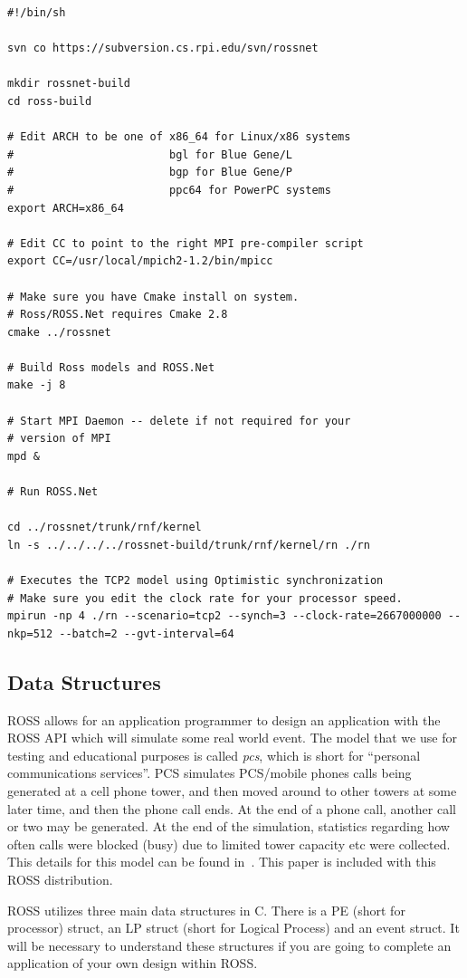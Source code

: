 \documentclass[12pt]{article}
\begin{document}
\begin{verbatim}
#!/bin/sh

svn co https://subversion.cs.rpi.edu/svn/rossnet

mkdir rossnet-build
cd ross-build

# Edit ARCH to be one of x86_64 for Linux/x86 systems 
#                        bgl for Blue Gene/L
#                        bgp for Blue Gene/P
#                        ppc64 for PowerPC systems
export ARCH=x86_64

# Edit CC to point to the right MPI pre-compiler script
export CC=/usr/local/mpich2-1.2/bin/mpicc

# Make sure you have Cmake install on system.
# Ross/ROSS.Net requires Cmake 2.8
cmake ../rossnet

# Build Ross models and ROSS.Net
make -j 8

# Start MPI Daemon -- delete if not required for your
# version of MPI
mpd &

# Run ROSS.Net

cd ../rossnet/trunk/rnf/kernel
ln -s ../../../../rossnet-build/trunk/rnf/kernel/rn ./rn

# Executes the TCP2 model using Optimistic synchronization
# Make sure you edit the clock rate for your processor speed.
mpirun -np 4 ./rn --scenario=tcp2 --synch=3 --clock-rate=2667000000 --nkp=512 --batch=2 --gvt-interval=64
\end{verbatim}
 

\subsection{Data Structures}
ROSS allows for an application programmer to design an application with the
ROSS API which will simulate some real world event.  The model that we use for
testing and educational purposes is called {\em pcs}, which is short for
``personal communications services''.  PCS simulates PCS/mobile phones calls
being generated at a cell phone tower, and then moved around to other towers
at some later time, and then the phone call ends.  At the end of a phone call,
another call or two may be generated.  At the end of the simulation,
statistics regarding how often calls were blocked (busy) due to limited tower
capacity etc were collected. This details for this model can be found
in~\cite{carothers-pads-1995}. This paper is included with this ROSS
distribution.

ROSS utilizes three main data structures in C.  There is a PE (short for
processor) struct, an LP struct (short for Logical Process) and an event
struct.  It will be necessary to understand these structures if you are going
to complete an application of your own design within ROSS.
 
\end{document}
